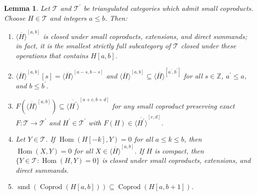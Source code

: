 \documentclass[11pt]{amsart}
\theoremstyle{plain}
\newtheorem{lemma}[theorem]{Lemma}
\theoremstyle{definition}
\numberwithin{equation}{section}
\numberwithin{theorem}{section}
\begin{document}
\begin{lemma}
    \label{lem:closures}
    Let $\mathcal{T}$ and $\mathcal{T}^\prime$ be triangulated categories which admit small coproducts. 
    Choose $H\in \mathcal{T}$ and integers $a\leq b$.
    Then:
    \begin{enumerate}
        \item \label{lem:closures1} $\overline{\langle H\rangle}^{[a,b]}$ is closed under small coproducts, extensions, and direct summands; in fact, it is the smallest strictly full subcategory of $\mathcal{T}$ closed under these operations that contains $H[a,b]$.
        \item \label{lem:closures2} $\overline{\langle H\rangle}^{[a,b]}[s] = \overline{\langle H\rangle}^{[a-s,b-s]}$ and $\overline{\langle H\rangle}^{[a,b]} \subseteq \overline{\langle H\rangle}^{[a^\prime,b^\prime]}$ for all $s\in \mathbb{Z}$, $a^\prime\leq a$, and $b\leq b^\prime$.
        \item \label{lem:closures3} $F(\overline{\langle H\rangle}^{[a,b]}) \subseteq \overline{\langle H^\prime\rangle}^{[a+c,b+d]}$ for any small coproduct preserving exact $F\colon \mathcal{T}\to \mathcal{T}^\prime$ and $H^\prime \in \mathcal{T}^\prime$ with $F(H)\in \overline{\langle H^\prime\rangle}^{[c,d]}$.
        \item \label{lem:closures4} Let $Y\in \mathcal{T}$. If $\operatorname{Hom}(H[-k],Y)=0$ for all $a\leq k\leq b$, then $\operatorname{Hom}(X,Y)=0$ for all $X\in \overline{\langle H\rangle}^{[a,b]}$. If $H$ is compact, then $\{Y\in \mathcal{T} : \operatorname{Hom}(H,Y)=0\}$ is closed under small coproducts, extensions, and direct summands.
        \item \label{lem:closures5} $\operatorname{smd}(\operatorname{Coprod}(H[a,b])) \subseteq \operatorname{Coprod}(H[a,b+1])$.
    \end{enumerate}
\end{lemma}
\end{document}
